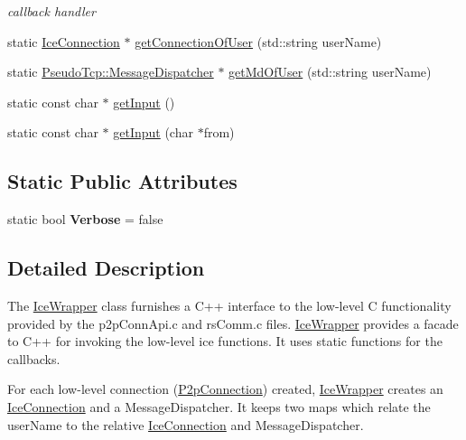 \begin{DoxyCompactItemize}
\begin{DoxyCompactList}\small\item\em callback handler \item\end{DoxyCompactList}\item 
static \hyperlink{classIceConnection}{IceConnection} $\ast$ \hyperlink{classIceWrapper_aa0cecd8091a65ccbfbe48c2397532e42}{getConnectionOfUser} (std::string userName)
\item 
static \hyperlink{classPseudoTcp_1_1MessageDispatcher}{PseudoTcp::MessageDispatcher} $\ast$ \hyperlink{classIceWrapper_a625864eb115efac6d31ea041f8093a77}{getMdOfUser} (std::string userName)
\item 
static const char $\ast$ \hyperlink{classIceWrapper_a34441a1215d0eb306b2227a9881609bd}{getInput} ()
\item 
static const char $\ast$ \hyperlink{classIceWrapper_a6e73ef401f985702be9d97abdbb1eb06}{getInput} (char $\ast$from)
\end{DoxyCompactItemize}
\subsection*{Static Public Attributes}
\begin{DoxyCompactItemize}
\item 
\hypertarget{classIceWrapper_a71005c441f47e761cb4d0e2bb68758ca}{
static bool {\bfseries Verbose} = false}
\label{classIceWrapper_a71005c441f47e761cb4d0e2bb68758ca}

\end{DoxyCompactItemize}


\subsection{Detailed Description}
The \hyperlink{classIceWrapper}{IceWrapper} class furnishes a C++ interface to the low-\/level C functionality provided by the p2pConnApi.c and rsComm.c files. \hyperlink{classIceWrapper}{IceWrapper} provides a facade to C++ for invoking the low-\/level ice functions. It uses static functions for the callbacks.

For each low-\/level connection (\hyperlink{structP2pConnection}{P2pConnection}) created, \hyperlink{classIceWrapper}{IceWrapper} creates an \hyperlink{classIceConnection}{IceConnection} and a MessageDispatcher. It keeps two maps which relate the userName to the relative \hyperlink{classIceConnection}{IceConnection} and MessageDispatcher.

